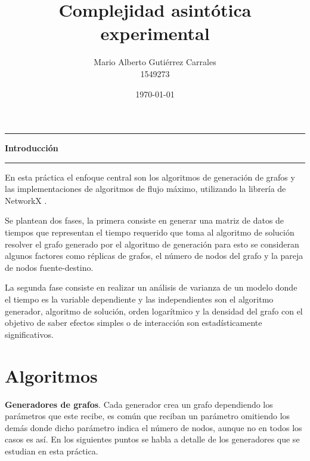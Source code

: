 \documentclass[12pt]{article}
\title{\textbf{Complejidad asintótica experimental}}
\author{Mario Alberto Gutiérrez Carrales \\
		1549273}
\date{\today}
\begin{document}
\maketitle

\begin{center}\rule{1.0\textwidth}{0.1mm} \end{center}
\vspace{-1cm}
\begin{center} \Large{\textbf{Introducción}} \end{center}
\vspace{-1cm}
\begin{center}\rule{1.0\textwidth}{0.2mm} \end{center}

En esta práctica el enfoque central son los algoritmos de generación de grafos y las implementaciones de algoritmos de flujo máximo, utilizando la librería de NetworkX \cite{Net}. 

Se plantean dos fases, la primera consiste en generar una matriz de datos de tiempos que representan el tiempo requerido que toma al algoritmo de solución resolver el grafo generado por el algoritmo de generación para esto se consideran algunos factores como réplicas de grafos, el número de nodos del grafo y la pareja de nodos fuente-destino. 

La segunda fase consiste en realizar un análisis de varianza de un modelo donde el tiempo es la variable dependiente y las independientes son el algoritmo generador, algoritmo de solución, orden logarítmico y la densidad del grafo con el objetivo de saber efectos simples o de interacción son estadísticamente significativos.
  
\newpage
\section{Algoritmos}

\textbf{Generadores de grafos}.
Cada generador crea un grafo dependiendo los parámetros que este recibe, es común que reciban un parámetro omitiendo los demás donde dicho parámetro indica el número de nodos, aunque no en todos los casos es así. En los siguientes puntos se habla a detalle de los generadores que se estudian en esta práctica.
\end{document}

